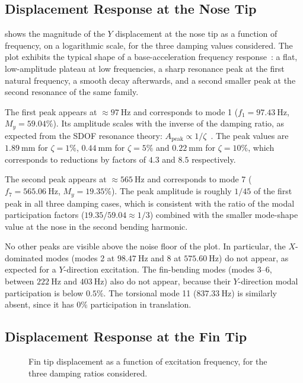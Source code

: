 \subsection{Displacement Response at the Nose Tip}

 shows the magnitude of the $Y$ displacement at the nose tip as a function of frequency, on a logarithmic scale, for the three damping values considered. The plot exhibits the typical shape of a base-acceleration frequency response~\cite{inman_engineering_vibration}: a flat, low-amplitude plateau at low frequencies, a sharp resonance peak at the first natural frequency, a smooth decay afterwards, and a second smaller peak at the second resonance of the same family.

The first peak appears at $\approx \SI{97}{\hertz}$ and corresponds to mode 1 ($f_1 = \SI{97.43}{\hertz}$, $M_y = 59.04\%$). Its amplitude scales with the inverse of the damping ratio, as expected from the SDOF resonance theory: $A_\text{peak} \propto 1/\zeta$~\cite{inman_engineering_vibration}. The peak values are $\SI{1.89}{\milli\metre}$ for $\zeta = 1\%$, $\SI{0.44}{\milli\metre}$ for $\zeta = 5\%$ and $\SI{0.22}{\milli\metre}$ for $\zeta = 10\%$, which corresponds to reductions by factors of $4.3$ and $8.5$ respectively.

The second peak appears at $\approx \SI{565}{\hertz}$ and corresponds to mode 7 ($f_7 = \SI{565.06}{\hertz}$, $M_y = 19.35\%$). The peak amplitude is roughly $1/45$ of the first peak in all three damping cases, which is consistent with the ratio of the modal participation factors ($19.35/59.04 \approx 1/3$) combined with the smaller mode-shape value at the nose in the second bending harmonic.

No other peaks are visible above the noise floor of the plot. In particular, the $X$-dominated modes (modes 2 at $\SI{98.47}{\hertz}$ and 8 at $\SI{575.60}{\hertz}$) do not appear, as expected for a $Y$-direction excitation. The fin-bending modes (modes 3--6, between $\SI{222}{\hertz}$ and $\SI{403}{\hertz}$) also do not appear, because their $Y$-direction modal participation is below $0.5\%$. The torsional mode 11 ($\SI{837.33}{\hertz}$) is similarly absent, since it has $0\%$ participation in translation.

\subsection{Displacement Response at the Fin Tip}

\begin{figure}[H]
    \centering
    
    \caption{Fin tip displacement as a function of excitation frequency, for the three damping ratios considered.}
    \label{fig:frf_fin}
\end{figure}

